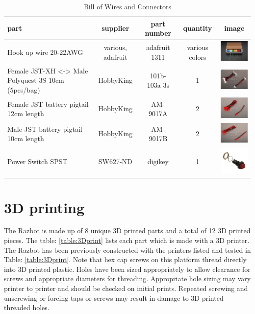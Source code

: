 \documentclass[12pt,titlepage,oneside]{memoir}
\begin{document}
\begin{table}[!h]
\begin{tabular}{p{5cm} | c | c | c | c}
part & supplier & part number & quantity & image \\
\hline
Hook up wire 20-22AWG & various, adafruit & adafruit 1311 & various colors & \includegraphics[width=80px]{picture/wires.jpg}\\
Female JST-XH <-> Male Polyquest 3S 10cm (5pcs/bag) & HobbyKing & 101b-103a-3s & 1 & \includegraphics[width=80px]{picture/jstext.jpg}\\
Female JST battery pigtail 12cm length & HobbyKing & AM-9017A & 2 & \includegraphics[width=80px]{picture/fjst.jpg}\\
Male JST battery pigtail 10cm length & HobbyKing & AM-9017B & 2 & \includegraphics[width=80px]{picture/mjst.jpg}\\
Power Switch SPST & SW627-ND & digikey & 1 & \includegraphics[width=80px]{picture/pwr.jpg}

\end{tabular}
\caption{Bill of Wires and Connectors}
\label{table:wires}
\end{table}


\section{3D printing}

The Razbot is made up of 8 unique 3D printed parts and a total of 12 3D printed pieces. The table: \ref{table:3Dprint} lists each part which is made with a 3D printer. The Razbot has been previously constructed with the printers listed and tested in Table: \ref{table:3Dprint}. Note that hex cap screws on this platform thread directly into 3D printed plastic. Holes have been sized appropriately to allow clearance for screws and appropriate diameters for threading. Appropriate hole sizing may vary printer to printer and should be checked on initial prints. Repeated screwing and unscrewing or forcing taps or screws may result in damage to 3D printed threaded holes.  
\end{document}
